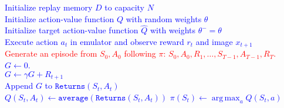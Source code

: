 \documentclass{standalone}
\DeclareMathOperator*{\argmax}{arg\,max}
\begin{document}
\pagestyle{empty}
\begin{algorithm}[H]
  \textcolor{blue}{Initialize replay memory $D$ to capacity $N$\\
  Initialize action-value function $Q$ with random weights $\theta$\\
  Initialize target action-value function $\hat{Q}$ with weights $\theta^{-}=\theta$} \\
 {
  \textcolor{blue}{Execute action $a_t$ in emulator and observe reward $r_t$ and image $x_{t+1}$} \\
  \textcolor{red}{Generate an episode from $S_0, A_0$ following $\pi$: $S_0, A_0, R_1, \ldots,   S_{T-1}, A_{T-1}, R_T$.}\\
  \textcolor{blue}{$G \gets 0$.}\\
   {
    \textcolor{blue}{$G \gets \gamma G + R_{t+1}$ \\
     {
Append $G$ to $\texttt{Returns}(S_t, A_t)$ \\
$Q(S_t, A_t) \gets \texttt{average}(\texttt{Returns}(S_t, A_t))$ 
$\pi(S_t) \gets \argmax_a Q(S_t, a)$ }
    }
  }
}
\end{algorithm}
\end{document}

